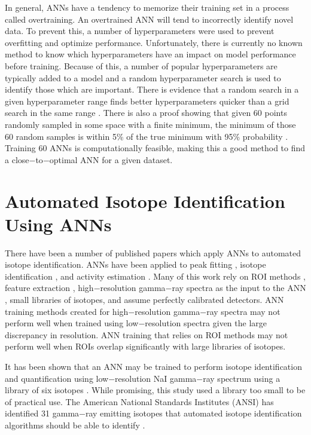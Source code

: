 \documentclass[tocnosub,noragright,centerchapter,12pt,fullpage]{uiucecethesis09}
\begin{document}
In general, ANNs have a tendency to memorize their training set in a process called overtraining. An overtrained ANN will tend to incorrectly identify novel data. To prevent this, a number of hyperparameters were used to prevent overfitting and optimize performance. Unfortunately, there is currently no known method to know which hyperparameters have an impact on model performance before training. Because of this, a number of popular hyperparameters are typically added to a model and a random hyperparameter search is used to identify those which are important. There is evidence that a random search in a given hyperparameter range finds better hyperparameters quicker than a grid search in the same range \cite{Bergstra2012}. There is also a proof showing that given 60 points randomly sampled in some space with a finite minimum, the minimum of those 60 random samples is within 5\% of the true minimum with 95\% probability \cite{Zheng2015}. Training 60 ANNs is computationally feasible, making this a good method to find a close$-$to$-$optimal ANN for a given dataset. 



\section{Automated Isotope Identification Using ANNs}

There have been a number of published papers which apply ANNs to automated isotope identification. ANNs have been applied to peak fitting \cite{Abdel-Aal2002}, isotope identification \cite{Abdel-Aal1996, Medhat2012}, and activity estimation \cite{Abdel-Aal1996, Vigneron1996}. Many of this work rely on ROI methods \cite{Pilato1999}, feature extraction \cite{Chen2009}, high$-$resolution gamma$-$ray spectra as the input to the ANN \cite{Yoshida2002}, small libraries of isotopes, and assume perfectly calibrated detectors. ANN training methods created for high$-$resolution gamma$-$ray spectra may not perform well when trained using low$-$resolution spectra given the large discrepancy in resolution. ANN training that relies on ROI methods may not perform well when ROIs overlap significantly with large libraries of isotopes.

It has been shown that an ANN may be trained to perform isotope identification and quantification using low$-$resolution NaI gamma$-$ray spectrum using a library of six isotopes \cite{Olmos1991}. While promising, this study used a library too small to be of practical use. The American National Standards Institutes (ANSI) has identified 31 gamma$-$ray emitting isotopes that automated isotope identification algorithms should be able to identify \cite{ANSI}.
\end{document}
